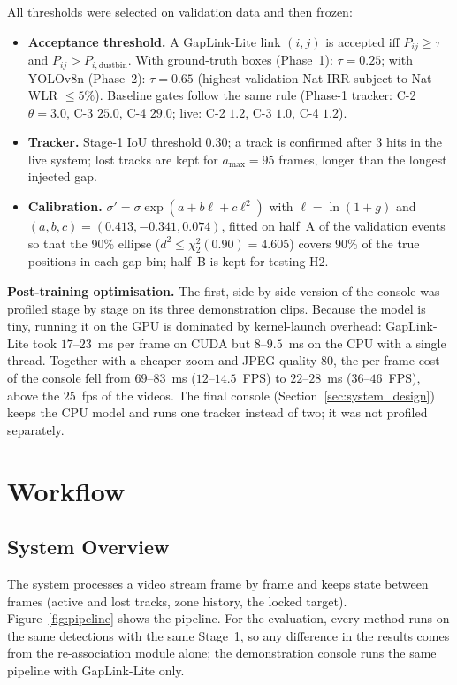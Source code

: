 All thresholds were selected on validation data and then frozen:
\begin{itemize}
    \item \textbf{Acceptance threshold.} A GapLink-Lite link $(i,j)$ is accepted iff $P_{ij} \ge \tau$ and $P_{ij} > P_{i,\text{dustbin}}$. With ground-truth boxes (Phase~1): $\tau = 0.25$; with YOLOv8n (Phase~2): $\tau = 0.65$ (highest validation Nat-IRR subject to Nat-WLR $\le 5\%$). Baseline gates follow the same rule (Phase-1 tracker: C-2 $\theta=3.0$, C-3 $25.0$, C-4 $29.0$; live: C-2 $1.2$, C-3 $1.0$, C-4 $1.2$).
    \item \textbf{Tracker.} Stage-1 IoU threshold $0.30$; a track is confirmed after $3$ hits in the live system; lost tracks are kept for $a_{\max} = 95$ frames, longer than the longest injected gap.
    \item \textbf{Calibration.} $\sigma' = \sigma \exp(a + b\ell + c\ell^2)$ with $\ell = \ln(1+g)$ and $(a,b,c) = (0.413, -0.341, 0.074)$, fitted on half~A of the validation events so that the 90\% ellipse ($d^2 \le \chi^2_2(0.90) = 4.605$) covers 90\% of the true positions in each gap bin; half~B is kept for testing H2.
\end{itemize}

\textbf{Post-training optimisation.} The first, side-by-side version of the console was profiled stage by stage on its three demonstration clips. Because the model is tiny, running it on the GPU is dominated by kernel-launch overhead: GapLink-Lite took $17$--$23$~ms per frame on CUDA but $8$--$9.5$~ms on the CPU with a single thread. Together with a cheaper zoom and JPEG quality $80$, the per-frame cost of the console fell from $69$--$83$~ms ($12$--$14.5$~FPS) to $22$--$28$~ms ($36$--$46$~FPS), above the $25$~fps of the videos. The final console (Section~\ref{sec:system_design}) keeps the CPU model and runs one tracker instead of two; it was not profiled separately.

\section{Workflow}
\label{sec:workflow}

\subsection{System Overview}
\label{sec:system_overview}

The system processes a video stream frame by frame and keeps state between frames (active and lost tracks, zone history, the locked target). Figure~\ref{fig:pipeline} shows the pipeline. For the evaluation, every method runs on the same detections with the same Stage~1, so any difference in the results comes from the re-association module alone; the demonstration console runs the same pipeline with GapLink-Lite only.

